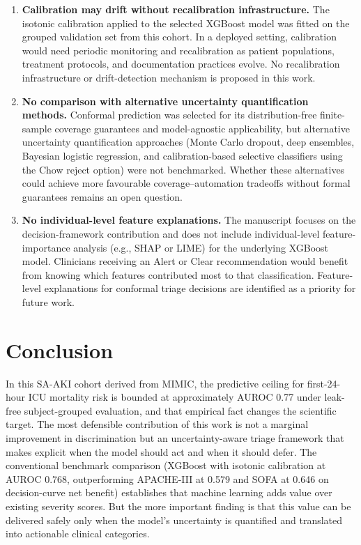 \begin{enumerate}
\item \textbf{Calibration may drift without recalibration infrastructure.} The isotonic calibration applied to the selected XGBoost model was fitted on the grouped validation set from this cohort. In a deployed setting, calibration would need periodic monitoring and recalibration as patient populations, treatment protocols, and documentation practices evolve. No recalibration infrastructure or drift-detection mechanism is proposed in this work.

\item \textbf{No comparison with alternative uncertainty quantification methods.} Conformal prediction was selected for its distribution-free finite-sample coverage guarantees and model-agnostic applicability, but alternative uncertainty quantification approaches (Monte Carlo dropout, deep ensembles, Bayesian logistic regression, and calibration-based selective classifiers using the Chow reject option) were not benchmarked. Whether these alternatives could achieve more favourable coverage--automation tradeoffs without formal guarantees remains an open question.

\item \textbf{No individual-level feature explanations.} The manuscript focuses on the decision-framework contribution and does not include individual-level feature-importance analysis (e.g., SHAP or LIME) for the underlying XGBoost model. Clinicians receiving an Alert or Clear recommendation would benefit from knowing which features contributed most to that classification. Feature-level explanations for conformal triage decisions are identified as a priority for future work.
\end{enumerate}

\section{Conclusion}

In this SA-AKI cohort derived from MIMIC, the predictive ceiling for first-24-hour ICU mortality risk is bounded at approximately AUROC 0.77 under leak-free subject-grouped evaluation, and that empirical fact changes the scientific target. The most defensible contribution of this work is not a marginal improvement in discrimination but an uncertainty-aware triage framework that makes explicit when the model should act and when it should defer. The conventional benchmark comparison (XGBoost with isotonic calibration at AUROC 0.768, outperforming APACHE-III at 0.579 and SOFA at 0.646 on decision-curve net benefit) establishes that machine learning adds value over existing severity scores. But the more important finding is that this value can be delivered safely only when the model's uncertainty is quantified and translated into actionable clinical categories.


